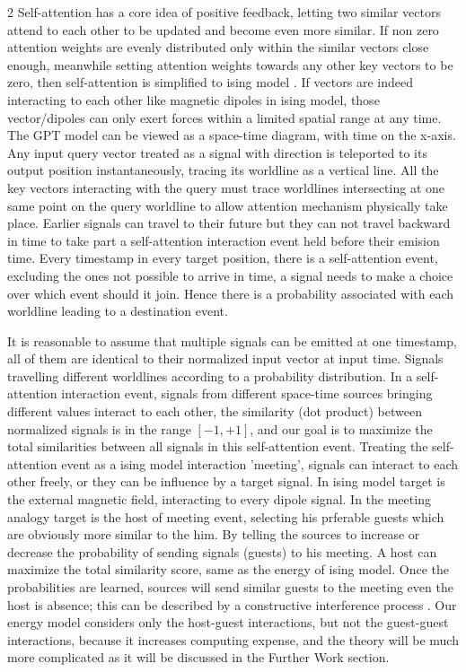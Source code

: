 \documentclass[11pt,a4paper]{article}
\begin{document}
\begin{multicols} {2}
Self-attention has a core idea of positive feedback, letting two similar vectors attend to each other to be updated and become even more similar.
If non zero attention weights are evenly distributed only within the similar vectors close enough, meanwhile setting attention weights towards any other key vectors to be zero, 
then self-attention is simplified to ising model \cite{ising}. If vectors are indeed interacting to each other like magnetic dipoles in ising model, 
those vector/dipoles can only exert forces within a limited spatial range at any time. The GPT \cite{Radford2018ImprovingLU} model can be viewed as a space-time diagram, 
with time on the x-axis. Any input query vector treated as a signal with direction is teleported to its output position instantaneously, tracing its worldline as a vertical line. 
All the key vectors interacting with the query must trace worldlines intersecting at one same point on the query worldline to allow attention mechanism physically take place. 
Earlier signals can travel to their future but they can not travel backward in time to take part a self-attention interaction event held before their emision time. 
Every timestamp in every target position, there is a self-attention event, excluding the ones not possible to arrive in time, a signal needs to make a choice over which event should it join. Hence there is a probability associated with each worldline leading to a destination event. 

It is reasonable to assume that multiple signals can be emitted at one timestamp, all of them are identical to their normalized input vector at input time. 
Signals travelling different worldlines according to a probability distribution. In a self-attention interaction event, signals from different space-time sources bringing different values 
interact to each other, the similarity (dot product) between normalized signals is in the range $[-1, +1]$, and our goal is to maximize the total similarities between all signals in this self-attention event. 
Treating the self-attention event as a ising model interaction 'meeting', signals can interact to each other freely, or they can be influence by a target signal. In ising model target is the external magnetic field, interacting to every dipole signal. 
In the meeting analogy target is the host of meeting event, selecting his prferable guests which are obviously more similar to the him. By telling the sources to increase or decrease the probability of sending signals (guests) to his meeting. 
A host can maximize the total similarity score, same as the energy of ising model. Once the probabilities are learned, sources will send similar guests to the meeting even the host is absence; this can be described by a constructive interference process \cite{BornWolf:1999:Book}. 
Our energy model considers only the host-guest interactions, but not the guest-guest interactions, because it increases computing expense, and the theory will be much more complicated as it will be discussed in the Further Work section.
\end{multicols}
\end{document}
